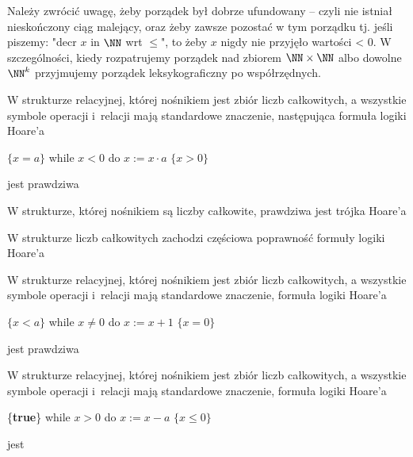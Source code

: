 Należy zwrócić uwagę, żeby porządek był dobrze ufundowany -- czyli nie istniał nieskończony ciąg malejący, oraz żeby zawsze pozostać w tym porządku tj. jeśli piszemy: "decr $x$ in $\NN$ wrt $\leq$", to żeby $x$ nigdy nie przyjęło wartości < 0. W szczególności, kiedy rozpatrujemy porządek nad zbiorem $\NN \times \NN$ albo dowolne $\NN^k$ przyjmujemy porządek leksykograficzny po współrzędnych.

\begin{problems}
    \prob W strukturze relacyjnej, której nośnikiem jest zbiór liczb całkowitych, a wszystkie symbole operacji i~relacji mają standardowe znaczenie, następująca formuła logiki Hoare'a
    \begin{center}
        $\{x = a\}$ while $x < 0$ do $x := x \cdot a$ $\{x > 0\}$
    \end{center}
    jest prawdziwa
    
    \prob W strukturze, której nośnikiem są liczby całkowite, prawdziwa jest trójka Hoare’a
    
    \prob W strukturze liczb całkowitych zachodzi częściowa poprawność formuły logiki Hoare'a

    \prob W strukturze relacyjnej, której nośnikiem jest zbiór liczb całkowitych, a wszystkie symbole operacji i~relacji mają standardowe znaczenie, formuła logiki Hoare'a
    \begin{center}
        $\{x < a\}$ while $x \neq 0$ do $x := x + 1$ $\{x = 0\}$
    \end{center}
    jest prawdziwa

    \prob W strukturze relacyjnej, której nośnikiem jest zbiór liczb całkowitych, a wszystkie symbole operacji i~relacji mają standardowe znaczenie, formuła logiki Hoare'a
    \begin{center}
        \{\textbf{true}\} while $x > 0$ do $x := x - a$ $\{x \leq 0\}$
    \end{center}
    jest


\end{problems}
